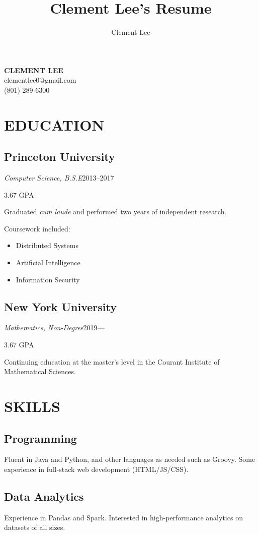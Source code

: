 \documentclass[11pt]{article}
\title{Clement Lee's Resume}
\author{Clement Lee}
\date{}
\begin{document}
{\Huge\textbf{CLEMENT LEE}}
\smallskip\\
clementlee0@gmail.com\\
(801) 289-6300\\

\begin{minipage}[t]{0.40\textwidth}
  \section*{\LARGE EDUCATION}
  \subsection*{Princeton University}
  \emph{Computer Science, B.S.E}\hfill 2013--2017
  
  \hfill 3.67 GPA
  \smallskip

  Graduated \emph{cum laude} and performed two years of independent research.

  Coursework included:
  \begin{itemize}
    \item Distributed Systems
    \item Artificial Intelligence
    \item Information Security
  \end{itemize}

  \medskip
  \subsection*{New York University}
  \emph{Mathematics, Non-Degree}\hfill2019---

  \hfill 3.67 GPA
  \smallskip
  
  Continuing education at the master's level in the Courant Institute of Mathematical Sciences. 

  \bigskip
  \section*{\LARGE SKILLS}

  \subsection*{Programming}
  Fluent in Java and Python, and other languages as needed such as Groovy.
  Some experience in full-stack web development (HTML/JS/CSS).

  \medskip
  \subsection*{Data Analytics}
  Experience in Pandas and Spark.
  Interested in high-performance analytics on datasets of all sizes.


\end{minipage}
\end{document}
